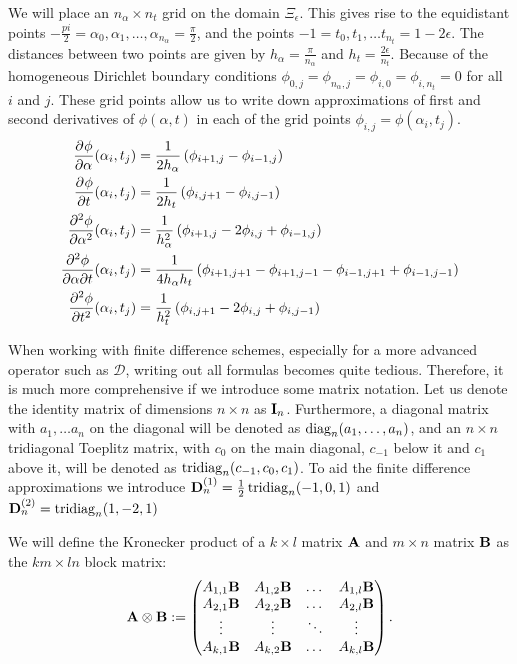 We will place an $n_\alpha \times n_t$ grid on the domain $\Xi_\epsilon$. This gives rise to the equidistant points $-\frac{pi}{2}=\alpha_0, \alpha_1, \dots, \alpha_{n_\alpha} = \frac{\pi}{2}$, and the points $-1 = t_0, t_1, \dots t_{n_t} = 1 - 2\epsilon$. The distances between two points are given by $h_\alpha = \frac{\pi}{n_\alpha}$ and $h_t = \frac{2\epsilon}{n_t}$. Because of the homogeneous Dirichlet boundary conditions $\phi_{0,j} = \phi_{n_\alpha,j} = \phi_{i, 0} = \phi_{i,n_t} = 0$ for all $i$ and $j$. These grid points allow us to write down approximations of first and second derivatives of $\phi(\alpha, t)$ in each of the grid points $\phi_{i, j} = \phi(\alpha_i, t_j)$.
\begin{align*}
    {\pdv[]{\phi}{\alpha}}(\alpha_i, t_j)    & = \frac{1}{2h_\alpha}\left( \phi_{i+1,j} - \phi_{i-1,j} \right)                                           \\
    {\pdv[]{\phi}{t}}(\alpha_i, t_j)         & = \frac{1}{2h_t}\left( \phi_{i,j+1} - \phi_{i,j-1} \right)                                                \\
    {\pdv[2]{\phi}{\alpha}}(\alpha_i, t_j)   & = \frac{1}{h_\alpha^2}\left( \phi_{i+1,j} - 2 \phi_{i,j} + \phi_{i-1,j} \right)                           \\
    {\pdv[]{\phi}{\alpha}{t}}(\alpha_i, t_j) & = \frac{1}{4h_\alpha h_t}\left( \phi_{i+1,j+1} - \phi_{i+1,j-1} - \phi_{i-1,j+1} + \phi_{i-1,j-1} \right) \\
    {\pdv[2]{\phi}{t}}(\alpha_i, t_j)        & = \frac{1}{h_t^2}\left( \phi_{i,j+1} - 2 \phi_{i,j} + \phi_{i,j-1} \right)
\end{align*}

When working with finite difference schemes, especially for a more  advanced operator such as $\mathcal{D}$, writing out all formulas becomes quite tedious. Therefore, it is much more comprehensive if we introduce some matrix notation. Let us denote the identity matrix of dimensions $n \times n$ as $\vb{I}_n$. Furthermore, a diagonal matrix with $a_1, \dots a_n$ on the diagonal will be denoted as $\operatorname{diag}_n(a_1, \dots, a_n)$, and an $n \times n$ tridiagonal Toeplitz matrix, with $c_{0}$ on the main diagonal, $c_{-1}$ below it and $c_1$ above it, will be denoted as $\operatorname{tridiag}_{n}(c_{-1}, c_{0}, c_1)$. To aid the finite difference approximations we introduce $\vb{D}^{(1)}_n = \frac{1}{2}\operatorname{tridiag}_n(-1,0,1)$ and $\vb{D}^{(2)}_n = \operatorname{tridiag}_n(1,-2,1)$

We will define the Kronecker product of a $k \times l$ matrix $\vb{A}$ and $m \times n$ matrix $\vb{B}$ as the $km \times ln$ block matrix:
$$
    \vb{A} \otimes \vb{B} := \begin{pmatrix}
        A_{1,1} \vb{B} & A_{1, 2} \vb{B} & \dots  & A_{1, l} \vb{B} \\
        A_{2,1} \vb{B} & A_{2, 2} \vb{B} & \dots  & A_{2, l} \vb{B} \\
        \vdots         & \vdots          & \ddots & \vdots          \\
        A_{k,1} \vb{B} & A_{k, 2} \vb{B} & \dots  & A_{k, l} \vb{B} \\
    \end{pmatrix}{}\text{.}
$$

